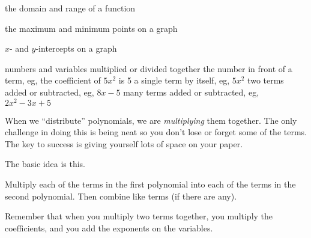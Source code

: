 \documentclass[fleqn,letterpaper,12pt,printwatermark=false]{memoir}
\begin{document}
\newcommand{\myClassName}{Pre-AP Algebra 2}
\newcommand{\myUnitNumber}{1}
\newcommand{\myUnitTitle}{Introduction to Functions}
\newcommand{\myLessonNumber}{3}
\newcommand{\myLessonTitle}{Distributing Polynomials}



\pagestyle{myPagestyle}

\checkandfixthelayout
{}

\begin{myNotesHeader}
    \item {} the domain and range of a function
    \item {} the maximum and minimum points on a graph
    \item {} $x$- and $y$-intercepts on a graph
\end{myNotesHeader}

\begin{myVocabulary}
    {
        numbers and variables multiplied or divided together
    }
    {
        the number in front of a term, 
        eg, the coefficient of $5x^2$ is 5
    }
    {
        a single term by itself, eg, $5x^2$
    }
        {
            two terms added or subtracted,
            eg, $8x-5$
        }
        {
            many terms added or subtracted,
            eg, $2x^2 - 3x + 5$
        }
\end{myVocabulary}

\begin{myLesson}[][]
    When we ``distribute'' polynomials, we are \emph{multiplying} them together.
    The only challenge in doing this
    is being neat so you don't lose or forget some of the terms.
    The key to success is giving yourself lots of space on your paper.

    The basic idea is this.
    \begin{myLessonBox}
        Multiply each of the terms in the first polynomial 
        into each of the terms in the second polynomial.
        Then combine like terms (if there are any).
    \end{myLessonBox}

    Remember that when you multiply two terms together,
    you multiply the coefficients, and you add the exponents on the variables.

\end{myLesson}
\end{document}
